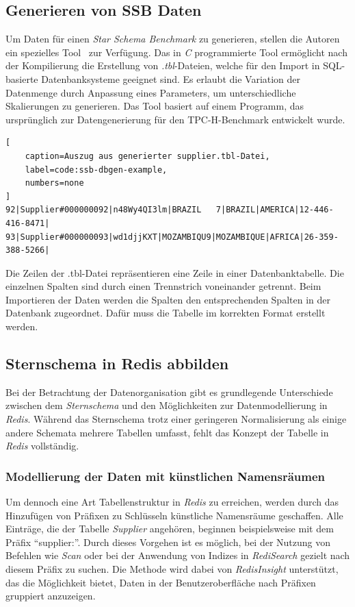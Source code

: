 \subsection{Generieren von SSB Daten}
Um Daten für einen \emph{Star Schema Benchmark} zu generieren, stellen die Autoren ein spezielles Tool~\cite{phillips_electrumssb-dbgen_2023} zur Verfügung.
Das in \emph{C} programmierte Tool ermöglicht nach der Kompilierung die Erstellung von \emph{.tbl}-Dateien, welche für den Import in SQL-basierte Datenbanksysteme geeignet sind.
Es erlaubt die Variation der Datenmenge durch Anpassung eines Parameters, um unterschiedliche Skalierungen zu generieren.
Das Tool basiert auf einem Programm, das ursprünglich zur Datengenerierung für den TPC-H-Benchmark entwickelt wurde.
\begin{lstlisting}[
    caption=Auszug aus generierter supplier.tbl-Datei,
    label=code:ssb-dbgen-example,
    numbers=none
]
92|Supplier#000000092|n48Wy4QI3lm|BRAZIL   7|BRAZIL|AMERICA|12-446-416-8471|
93|Supplier#000000093|wd1djjKXT|MOZAMBIQU9|MOZAMBIQUE|AFRICA|26-359-388-5266|
\end{lstlisting}
Die Zeilen der .tbl-Datei repräsentieren eine Zeile in einer Datenbanktabelle. Die einzelnen Spalten sind durch einen Trennstrich voneinander getrennt.
Beim Importieren der Daten werden die Spalten den entsprechenden Spalten in der Datenbank zugeordnet. Dafür muss die Tabelle im korrekten Format erstellt werden.

\subsection{Sternschema in Redis abbilden}
Bei der Betrachtung der Datenorganisation gibt es grundlegende Unterschiede zwischen dem \emph{Sternschema} und den Möglichkeiten zur Datenmodellierung in \emph{Redis}. Während das Sternschema trotz einer geringeren Normalisierung als einige andere Schemata mehrere Tabellen umfasst, fehlt das Konzept der Tabelle in \emph{Redis} vollständig.

\subsubsection{Modellierung der Daten mit künstlichen Namensräumen}
Um dennoch eine Art Tabellenstruktur in \emph{Redis} zu erreichen, werden durch das Hinzufügen von Präfixen zu Schlüsseln künstliche Namensräume geschaffen. Alle Einträge, die der Tabelle \emph{Supplier} angehören, beginnen beispielsweise mit dem Präfix \enquote{supplier:}. Durch dieses Vorgehen ist es möglich, bei der Nutzung von Befehlen wie \emph{Scan} oder bei der Anwendung von Indizes in \emph{RediSearch} gezielt nach diesem Präfix zu suchen. Die Methode wird dabei von \emph{RedisInsight} unterstützt, das die Möglichkeit bietet, Daten in der Benutzeroberfläche nach Präfixen gruppiert anzuzeigen.

